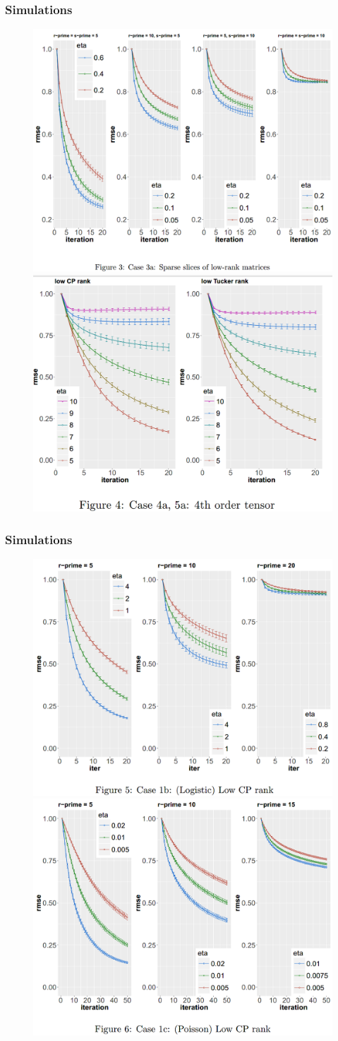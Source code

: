 \documentclass{beamer}
\begin{document}
	\begin{frame}
		\frametitle{Simulations}
		\begin{figure}
			\includegraphics[width=.45\linewidth]{image034.png}
			\includegraphics[width=.45\linewidth]{image035.png}
		\end{figure}
	\end{frame}
	
	
	\begin{frame}
		\frametitle{Simulations}
		\begin{figure}
			\includegraphics[width=.45\linewidth]{image036.png}
			\includegraphics[width=.45\linewidth]{image037.png}
		\end{figure}
	\end{frame}
	
\end{document}
